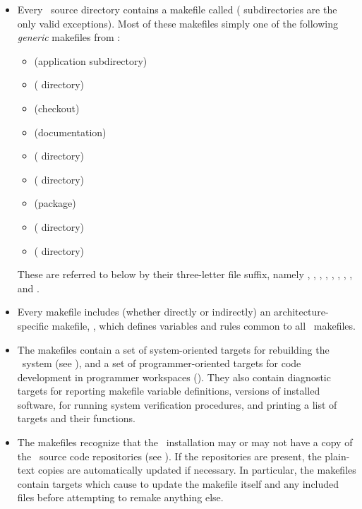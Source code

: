 \begin{itemize}
\item
   Every \aipspp\ source directory contains a makefile called
    ( subdirectories are the only valid exceptions).
   Most of these makefiles simply  one of the following
   {\em generic} makefiles from :

   \begin{itemize}
   \item
        (application subdirectory)
   \item
        ( directory)
   \item
        (checkout)
   \item
        (documentation)
   \item
        ( directory)
   \item
        ( directory)
   \item
        (package)
   \item
        ( directory)
   \item
        ( directory)
   \end{itemize}

   These are referred to below by their three-letter file suffix, namely
   , , , , , ,
   , , and .

\item
   Every makefile includes (whether directly or indirectly) an
   architecture-specific makefile, , which
   defines variables and rules common to all \aipspp\ makefiles.

\item
   The makefiles contain a set of system-oriented targets for rebuilding the
   \aipspp\ system (see ), and a set of
   programmer-oriented targets for code development in programmer workspaces
   ().  They also contain diagnostic targets for
   reporting makefile variable definitions, versions of installed software,
   for running system verification procedures, and printing a list of
   targets and their functions.

\item
   The makefiles recognize that the \aipspp\ installation may or may not
   have a copy of the \rcs\ source code repositories (see
   ).  If the repositories are present, the plain-text
   copies are automatically updated if necessary.  In particular, the
   makefiles contain targets which cause  to update the makefile
   itself and any included files before attempting to remake anything else.


\end{itemize}
